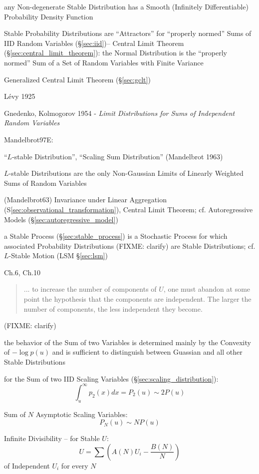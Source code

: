 any Non-degenerate Stable Distribution has a Smooth (Infinitely Differentiable)
Probability Density Function

Stable Probability Distributions are ``Attractors'' for ``properly normed'' Sums
of IID Random Variables (\S\ref{sec:iid})-- Central Limit Theorem
(\S\ref{sec:central_limit_theorem}): the Normal Distribution is the ``properly
normed'' Sum of a Set of Random Variables with Finite Variance

Generalized Central Limit Theorem (\S\ref{sec:gclt})

L\'evy 1925

Gnedenko, Kolmogorov 1954 - \emph{Limit Distributions for Sums of Independent
Random Variables}

Mandelbrot97E:

``$L$-stable Distribution'', ``Scaling Sum Distribution'' (Mandelbrot 1963)

$L$-stable Distributions are the only Non-Gaussian Limits of Linearly Weighted
Sums of Random Variables

(Mandelbrot63) Invariance under Linear Aggregation
(S\ref{sec:observational_transformation}), Central Limit Theorem; cf.
Autoregressive Models (\S\ref{sec:autoregressive_model})

a Stable Process (\S\ref{sec:stable_process}) is a Stochastic Process for which
associated Probability Distributions (FIXME: clarify) are Stable Distributions;
cf. $L$-Stable Motion (LSM \S\ref{sec:lsm})

Ch.6, Ch.10

\begin{quote}
  ... to increase the number of components of $U$, one must abandon at some
  point the hypothesis that the components are independent. The larger the
  number of components, the less independent they become.
\end{quote}
(FIXME: clarify)

the behavior of the Sum of two Variables is determined mainly by the Convexity
of $-\log p(u)$ and is sufficient to distinguish between Guassian and all other
Stable Distributions

for the Sum of two IID Scaling Variables (\S\ref{sec:scaling_distribution}):
\[
  \int_u^\infty p_2(x) dx = P_2(u) \sim 2 P(u)
\]

Sum of $N$ Asymptotic Scaling Variables:
\[
  P_N(u) \sim N P(u)
\]

Infinite Divisibility -- for Stable $U$:
\[
  U = \sum (A(N) U_i - \frac{B(N)}{N})
\]
of Independent $U_i$ for every $N$

